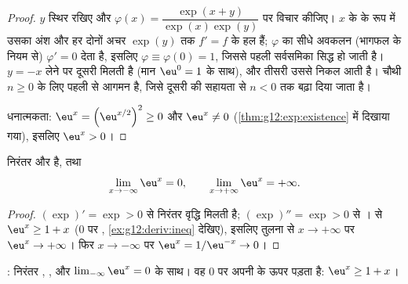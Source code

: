 \begin{proof}
$y$ स्थिर रखिए और $\varphi(x) = \dfrac{\exp(x+y)}{\exp(x)\exp(y)}$ पर विचार कीजिए। $x$ के  के रूप में उसका अंश और
हर दोनों अचर $\exp(y)$ तक $f' = f$ के हल हैं; $\varphi$ का सीधे अवकलन (भागफल के नियम से)
$\varphi' = 0$ देता है, इसलिए $\varphi \equiv \varphi(0) = 1$, जिससे पहली सर्वसमिका सिद्ध हो जाती है। $y = -x$ लेने पर
दूसरी मिलती है (मान $\eu^0 = 1$ के साथ), और तीसरी उससे निकल आती है। चौथी $n \geq 0$ के लिए
पहली से आगमन है, जिसे दूसरी की सहायता से $n < 0$ तक बढ़ा दिया जाता है।

धनात्मकता: $\eu^x = \left(\eu^{x/2}\right)^2 \geq 0$ और $\eu^x \neq 0$ (\cref{thm:g12:exp:existence} में दिखाया गया), इसलिए $\eu^x > 0$।
\end{proof}

\begin{proposition}[परिवर्तन और सीमाएँ]\label{prop:g12:exp:variations}
 निरंतर  और  है, तथा
\[
\lim_{x\to-\infty} \eu^x = 0, \qquad
\lim_{x\to+\infty} \eu^x = +\infty .
\]
\end{proposition}

\begin{proof}
$(\exp)' = \exp > 0$ से निरंतर वृद्धि मिलती है; $(\exp)'' = \exp > 0$ से ।  से $\eu^x \geq 1 + x$ ($0$ पर
, \cref{ex:g12:deriv:ineq} देखिए), इसलिए तुलना से $x \to +\infty$ पर $\eu^x \to +\infty$। फिर $x \to -\infty$ पर $\eu^{x} = 1/\eu^{-x} \to 0$।
\end{proof}

\begin{omfigure}

{\small {}: निरंतर , , और $\lim_{-\infty} \eu^x = 0$ के साथ। वह $0$ पर अपनी
 के ऊपर पड़ता है: $\eu^x \geq 1 + x$।}
\end{omfigure}

